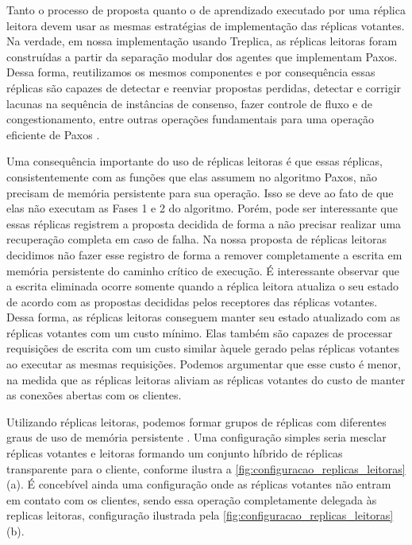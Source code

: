 Tanto o processo de proposta quanto o de aprendizado executado por uma réplica leitora
devem usar as mesmas estratégias de implementação das réplicas votantes. Na verdade, em
nossa implementação usando Treplica, as réplicas leitoras foram construídas a partir da
separação modular dos agentes que implementam Paxos. Dessa forma, reutilizamos os mesmos
componentes e por consequência essas réplicas são capazes de detectar e reenviar propostas
perdidas, detectar e corrigir lacunas na sequência de instâncias de consenso, fazer
controle de fluxo e de congestionamento, entre outras operações fundamentais para uma
operação eficiente de Paxos \cite{vieira-tr10b}.

Uma consequência importante do uso de réplicas leitoras é que essas réplicas,
consistentemente com as funções que elas assumem no algoritmo Paxos, não precisam de
memória persistente para sua operação. Isso se deve ao fato de que elas não executam as
Fases 1 e 2 do algoritmo. Porém, pode ser interessante que essas réplicas registrem a
proposta decidida de forma a não precisar realizar uma recuperação completa em caso de
falha. Na nossa proposta de réplicas leitoras decidimos não fazer esse registro de forma a
remover completamente a escrita em memória persistente do caminho crítico de execução. É
interessante observar que a escrita eliminada ocorre somente quando a réplica leitora
atualiza o seu estado de acordo com as propostas decididas pelos receptores das réplicas
votantes. Dessa forma, as réplicas leitoras conseguem manter seu estado atualizado com as
réplicas votantes com um custo mínimo. Elas também são capazes de processar requisições de
escrita com um custo similar àquele gerado pelas réplicas votantes ao executar as mesmas
requisições. Podemos argumentar que esse custo é menor, na medida que as réplicas leitoras
aliviam as réplicas votantes do custo de manter as conexões abertas com os clientes.

Utilizando réplicas leitoras, podemos formar grupos de réplicas com diferentes graus de
uso de memória persistente \cite{aguilera00}. Uma configuração simples seria mesclar
réplicas votantes e leitoras formando um conjunto híbrido de réplicas transparente para o
cliente, conforme ilustra a \autoref{fig:configuracao_replicas_leitoras} (a). É concebível
ainda uma configuração onde as réplicas votantes não entram em contato com os clientes,
sendo essa operação completamente delegada às replicas leitoras, configuração ilustrada
pela \autoref{fig:configuracao_replicas_leitoras} (b).

